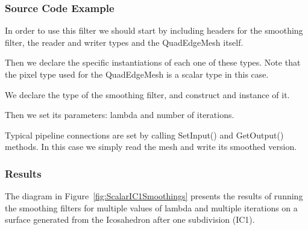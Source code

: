 \documentclass{InsightArticle}
\begin{document}
\subsubsection{Source Code Example}

In order to use this filter we should start by including headers for the
smoothing filter, the reader and writer types and the QuadEdgeMesh itself.

\begin{center}

\end{center}

Then we declare the specific instantiations of each one of these types. Note that the
pixel type used for the QuadEdgeMesh is a scalar type in this case.

\begin{center}

\end{center}

We declare the type of the smoothing filter, and construct and instance of it. 

\begin{center}

\end{center}

Then we set its parameters: lambda and number of iterations.

\begin{center}

\end{center}

Typical pipeline connections are set by calling SetInput() and GetOutput() methods.
In this case we simply read the mesh and write its smoothed version.

\begin{center}

\end{center}


\subsubsection{Results}

The diagram in Figure~\ref{fig:ScalarIC1Smoothings} presents the results of
running the smoothing filters for multiple values of lambda and multiple
iterations on a surface generated from the Icosahedron after one subdivision
(IC1).
\end{document}
